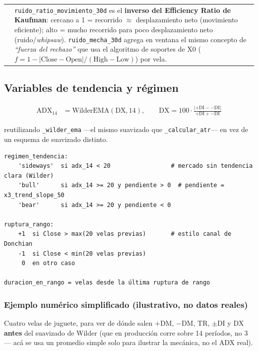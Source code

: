 \documentclass[11pt,a4paper]{article}
\makeatletter
\newcommand{\code}[1]{\texttt{\small #1}}
\newenvironment{nota}{%
  \par\medskip\noindent
  \begin{tabular}{@{}p{0.4em}@{\hspace{8pt}}p{\dimexpr\linewidth-2em\relax}@{}}
  \textcolor{cnaranja}{\rule{3pt}{1.1em}} &
}{\end{tabular}\par\medskip}
\newcommand{\dq}[1]{\emph{``#1''}}
\makeatother
\begin{document}
\begin{nota}
\code{ruido\_ratio\_movimiento\_30d} es el \textbf{inverso del Efficiency Ratio de
Kaufman}: cercano a 1 = recorrido \(\approx\) desplazamiento neto (movimiento eficiente);
alto = mucho recorrido para poco desplazamiento neto (ruido/\emph{whipsaw}).
\code{ruido\_mecha\_30d} agrega en ventana el mismo concepto de \dq{fuerza del rechazo} que
usa el algoritmo de soportes de X0 (\(f = 1-|\text{Close}-\text{Open}|/(\text{High}-
\text{Low})\)) por vela.
\end{nota}

\subsection{Variables de tendencia y régimen}

\begin{align}
\mathrm{ADX}_{14} &= \mathrm{WilderEMA}(\mathrm{DX}, 14), \qquad
  \mathrm{DX} = 100 \cdot \frac{|{+}\mathrm{DI} - {-}\mathrm{DI}|}{{+}\mathrm{DI}+{-}
  \mathrm{DI}}
\end{align}

reutilizando \code{\_wilder\_ema} —el mismo suavizado que \code{\_calcular\_atr}— en vez de
un esquema de suavizado distinto.

\begin{lstlisting}
regimen_tendencia:
    'sideways'  si adx_14 < 20                 # mercado sin tendencia clara (Wilder)
    'bull'      si adx_14 >= 20 y pendiente > 0  # pendiente = x3_trend_slope_50
    'bear'      si adx_14 >= 20 y pendiente < 0

ruptura_rango:
    +1  si Close > max(20 velas previas)       # estilo canal de Donchian
    -1  si Close < min(20 velas previas)
     0  en otro caso

duracion_en_rango = velas desde la última ruptura de rango
\end{lstlisting}

\subsubsection*{Ejemplo numérico simplificado (ilustrativo, no datos reales)}

Cuatro velas de juguete, para ver de dónde salen \(+\mathrm{DM}\), \(-\mathrm{DM}\),
\(\mathrm{TR}\), \(\pm\mathrm{DI}\) y \(\mathrm{DX}\) \textbf{antes} del suavizado de
Wilder (que en producción corre sobre 14 períodos, no 3 — acá se usa un promedio simple
solo para ilustrar la mecánica, no el ADX real).
\end{document}
